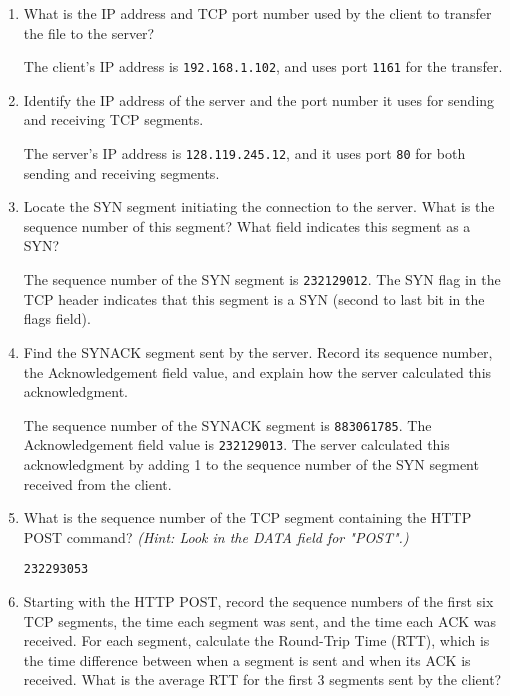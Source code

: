 \documentclass[12pt]{article}
\begin{document}
\begin{enumerate}[label=Q\arabic*:, resume]
    \item What is the IP address and TCP port number used by the client to
          transfer the file to the server?

          The client's IP address is \texttt{192.168.1.102}, and uses port \texttt{1161} for the transfer.

    \item Identify the IP address of the server and the port number it uses for
          sending and receiving TCP segments.

          The server's IP address is \texttt{128.119.245.12}, and it uses port
          \texttt{80} for both sending and receiving segments.

    \item Locate the SYN segment initiating the connection to the server. What
          is the sequence number of this segment? What field indicates this segment as
          a SYN?

          The sequence number of the SYN segment is \texttt{232129012}. The SYN flag in the
          TCP header indicates that this segment is a SYN (second to last bit in
          the flags field).

    \item Find the SYNACK segment sent by the server. Record its sequence
          number, the Acknowledgement field value, and explain how the server
          calculated this acknowledgment.

          The sequence number of the SYNACK segment is \texttt{883061785}. The Acknowledgement
          field value is \texttt{232129013}. The server calculated this acknowledgment
          by adding 1 to the sequence number of the SYN segment received from the client.

    \item What is the sequence number of the TCP segment containing the HTTP
          POST command? \textit{(Hint: Look in the DATA field for "POST".)}

          \texttt{232293053}

    \item Starting with the HTTP POST, record the sequence numbers of the first
          six TCP segments, the time each segment was sent, and the time each ACK was
          received. For each segment, calculate the Round-Trip Time (RTT), which is
          the time difference between when a segment is sent and when its ACK is
          received. What is the average RTT for the first 3 segments sent by the
          client?


\end{enumerate}
\end{document}
